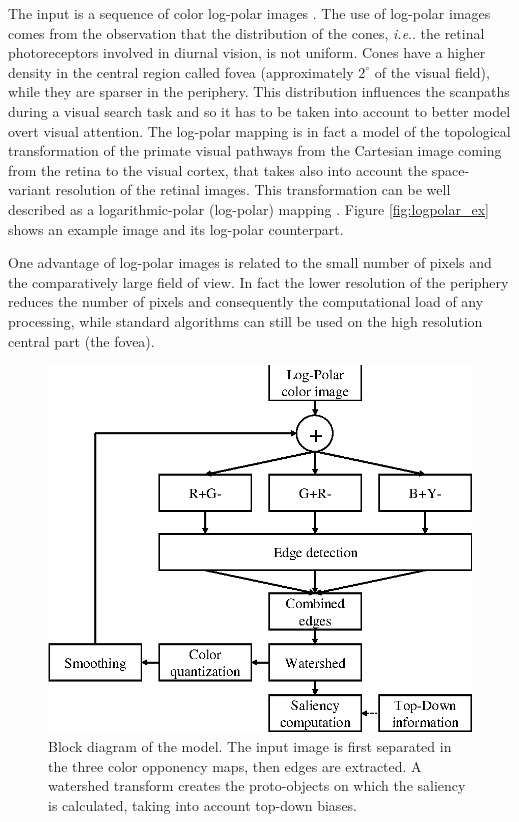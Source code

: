 \documentclass{llncs}
\makeatletter
\DeclareRobustCommand\onedot{\futurelet\@let@token\@onedot}
\def\@onedot{\ifx\@let@token.\else.\null\fi\xspace}
\def\ie{\emph{i.e}\onedot} \def\Ie{\emph{I.e}\onedot}
\makeatother
\begin{document}
The input is a sequence of color log-polar images \cite{SandiniT80}.
The use of log-polar images comes from the
observation that the distribution of the cones, \ie the
retinal photoreceptors involved in diurnal vision,
is not uniform. Cones have a higher density
in the central region called fovea (approximately $2^\circ$ of
the visual field), while they are sparser in the
periphery.
This distribution influences the
scanpaths during a visual search task \cite{WolfeG96} and so it has to
be taken into account to better model overt visual
attention. The log-polar mapping is in fact a model of the topological
transformation of the primate visual pathways from the
Cartesian image coming from the retina to the visual cortex, that takes also into
account the space-variant resolution of the retinal images.
This transformation can be well
described as a logarithmic-polar (log-polar) mapping \cite{SandiniT80}.
Figure \ref{fig:logpolar_ex} shows an example image and its
log-polar counterpart.

One advantage of log-polar images is related to the small
number of pixels and the comparatively large field of view.
In fact the lower resolution of the periphery reduces the
number of pixels and consequently the computational load of any
processing, while standard algorithms can still be used on the high resolution
central part (the fovea).

\begin{figure}[t]
  \begin{center}
    \includegraphics[width=0.6\linewidth]{./figs/attention/schema}
    \caption{Block diagram of the model. The input image is first separated in
     the three color opponency maps, then edges are extracted. A watershed transform
     creates the proto-objects on which the saliency is calculated,
     taking into account top-down biases.}
     \label{fig:model_diagram}
  \end{center}
\end{figure}
\end{document}
